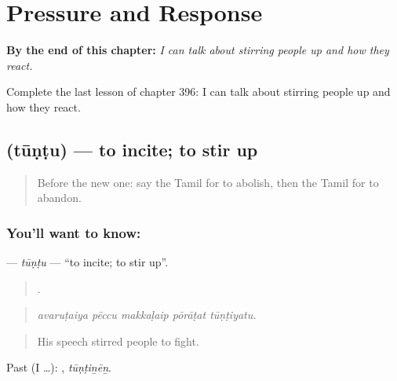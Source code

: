 
\chapter{Pressure and Response}
\label{ch:ta-pressure-and-response}

\begin{chapteropening}
\textbf{By the end of this chapter:} \emph{I can talk about stirring people up and how they react.}

Complete the last lesson of chapter 396: I can talk about stirring people up and how they react.
\end{chapteropening}

\section[\texorpdfstring{\ta{தூண்டு} (tūṇṭu)}{தூண்டு (tūṇṭu)}]{ (tūṇṭu) — to incite; to stir up}

\label{lesson:TA-C396-tuntu}



\begin{quote}
Before the new one: say the Tamil for to abolish, then the Tamil for to abandon.
\end{quote}

\subsection*{You'll want to know: }
\textbf{} — \emph{tūṇṭu} — \textquotedblleft{}to incite; to stir up\textquotedblright{}.

\begin{quote}
    .
\end{quote}

\begin{quote}
\emph{avaruṭaiya pēccu makkaḷaip pōrāṭat tūṇṭiyatu.}
\end{quote}

\begin{quote}
His speech stirred people to fight.
\end{quote}

Past (I …): , \emph{tūṇṭiṉēṉ}.

